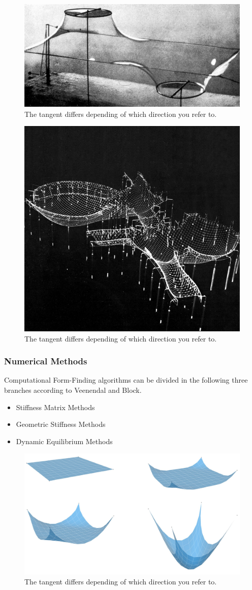 \begin{figure}[H]
\centering
\includegraphics[width=0.6\linewidth ]{figure/Theory/Soap.jpg}
\caption{The tangent differs depending of which direction you refer to. }
\end{figure}

\begin{figure}[H]
\centering
\includegraphics[width=0.6\linewidth ]{figure/Theory/Multihalle.jpg}
\caption{The tangent differs depending of which direction you refer to. }
\end{figure}



\subsubsection{Numerical Methods}


Computational Form-Finding algorithms can be divided in the following three branches according to Veenendal and Block. 

\begin{itemize}
\item Stiffness Matrix Methods
\item Geometric Stiffness Methods
\item Dynamic Equilibrium Methods 
\end{itemize}

\begin{figure}[H]
\centering
\includegraphics[width=0.6\linewidth ]{figure/Theory/PartSpring.jpg}
\caption{The tangent differs depending of which direction you refer to. }
\end{figure}


